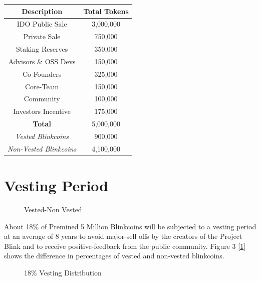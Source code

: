 \documentclass[a4paper,12pt]{article}
\begin{document}
\begin{table}[!ht]
    \centering
    \begin{tabular}{|c|c|}
    \hline
        \textbf{Description} & \textbf{Total Tokens} \\ \hline
        IDO Public Sale & 3,000,000\\
        Private Sale & 750,000\\
		Staking Reserves & 350,000 \\
		Advisors \& OSS Devs & 150,000 \\
		Co-Founders & 325,000 \\
		Core-Team & 150,000 \\
		Community & 100,000 \\
		Investors Incentive & 175,000 \\ \hline 
		\textbf{Total} & 5,000,000 \\ \hline \hline
		\textit{Vested Blinkcoins} & 900,000\\
        \textit{Non-Vested Blinkcoins} & 4,100,000\\ \hline
    \end{tabular}
\end{table}


\section{Vesting Period}

\begin{center}
\begin{figure}[H]\label{vest-nonvest}
\centering
{}
\caption{Vested-Non Vested}
\end{figure}
\end{center}

About 18\% of Premined 5 Million Blinkcoins will be subjected to a vesting period at an average of 8 years to avoid major-sell offs by the creators of the Project Blink and to receive positive-feedback from the public community. Figure 3 [\ref{vest-nonvest}] shows the difference in percentages of vested and non-vested blinkcoins.

\begin{center}
\begin{figure}[H]
\centering
{}
\caption{18\% Vesting Distribution}
\end{figure}
\end{center}
\end{document}
